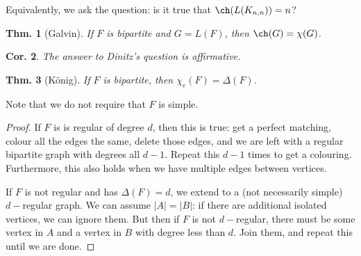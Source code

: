 \documentclass[12pt, a4paper]{book}
\newtheorem{theorem}{Thm.}[section]
\newtheorem{corollary}[theorem]{Cor.}
\theoremstyle{nonumberplain}
\newtheorem{proof}{Proof}
\begin{document}
Equivalently, we ask the question: is it true that $\ch(L(K_{n,n}))=n$?
\begin{theorem}[Galvin]
    If $F$ is bipartite and $G=L(F)$, then $\ch(G)=\chi(G)$.
\end{theorem}
\begin{corollary}
    The answer to Dinitz's question is affirmative.
\end{corollary}
\begin{theorem}[K\"onig]
    If $F$ is bipartite, then $\chi_e(F)=\Delta(F)$.
\end{theorem}
Note that we do not require that $F$ is simple.
\begin{proof}
    If $F$ is is regular of degree $d$, then this is true: get a perfect matching, colour all the edges the same, delete those edges, and we are left with a regular bipartite graph with degrees all $d-1$.
    Repeat this $d-1$ times to get a colouring.
    Furthermore, this also holds when we have multiple edges between vertices.

    If $F$ is not regular and has $\Delta(F)=d$, we extend to a (not necessarily simple) $d-$regular graph.
    We can assume $|A|=|B|$: if there are additional isolated vertices, we can ignore them.
    But then if $F$ is not $d-$regular, there must be some vertex in $A$ and a vertex in $B$ with degree less than $d$.
    Join them, and repeat this until we are done.
\end{proof}
\end{document}
